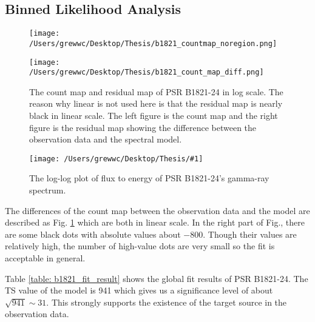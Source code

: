 \documentclass[12pt]{report}
\newcommand{\singleFig}[3]{
  \begin{figure}[!ht]
    \centering
    \texttt{[image: /Users/grewwc/Desktop/Thesis/\#1]}
    \caption{#3}
    \label{fig: #1}
  \end{figure}
}
\begin{document}
              \subsection{Binned Likelihood Analysis}
              \begin{figure}[!ht]
                \begin{center}
                \begin{minipage}{0.45\textwidth}
                  \begin{center} 
                    \texttt{[image: /Users/grewwc/Desktop/Thesis/b1821\_countmap\_noregion.png]}
                  \end{center}
                \end{minipage}
                \begin{minipage}{0.45\textwidth}
                  \begin{center}
                    \texttt{[image: /Users/grewwc/Desktop/Thesis/b1821\_count\_map\_diff.png]}
                  \end{center}
                \end{minipage}
              \end{center}
              \caption{The count map and residual map of PSR B1821-24 in log scale. 
              The reason why linear is not used here is that the residual map is nearly black in linear scale.
              The \textsf{left} figure is the count map and the \textsf{right} 
              figure is the residual map showing the difference between the observation data and the spectral model.}
              \label{fig: b1821_count_map_diff.png}
            \end{figure}

            \singleFig{b1821_cur.png}{0.40}{The log-log plot of flux to energy of 
              PSR B1821-24's gamma-ray spectrum.}
              \vspace{1cm}

            The differences of the count map between the observation data and the model are described as Fig. 
            \ref{fig: b1821_count_map_diff.png} which are both in linear scale. In the right part of Fig., 
            there are some black dots 
            with absolute values about $-800$. Though their values are relatively high, the number of 
            high-value dots are very small so the fit is acceptable in general. 

            Table \ref{table: b1821_fit_result} shows the global fit results of PSR B1821-24. 
            The TS value of the model is 941 which gives us a significance level 
            of about $\sqrt{941} \sim 31$. This strongly supports the existence of the target source in 
            the observation data.
\end{document}
